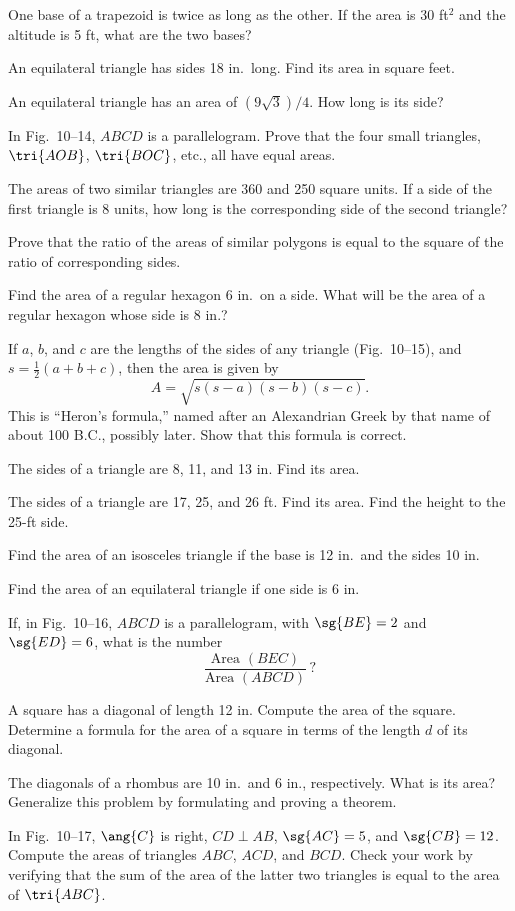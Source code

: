 \documentclass[11pt]{book}
\theoremstyle{bkplain}
\theoremstyle{XIplainnote}
\theoremstyle{bkplain}
\theoremstyle{bkplain}
\begin{document}
\begin{exercisecols}
\begin{exlist}
\item One base of a trapezoid is twice as long as the other. If the area is
  30 ft$^2$ and the altitude is 5 ft, what are the two bases?
\item An equilateral triangle has sides 18 in.\ long. Find its area in square
  feet.
\item An equilateral triangle has an area of $(9\sqrt{3})/4$. How long is its
  side?
\item In Fig.~10--14, $ABCD$ is a parallelogram. Prove that the four small
  triangles, $\tri{AOB}$, $\tri{BOC}$, etc., all have equal areas.
\exfig{\FIGXFOURTEEN}
\item The areas of two similar triangles are 360 and 250 square units. If a
  side of the first triangle is 8 units, how long is the corresponding side of
  the second triangle?
\item[\stex 28.] Prove that the ratio of the areas of similar polygons is equal
  to the square of the ratio of corresponding sides.
\item[29.] Find the area of a regular hexagon 6 in.\ on a side. What will be
  the area of a regular hexagon whose side is 8 in.?
\item[\stex 30.] If $a$, $b$, and $c$ are the lengths of the sides of any
  triangle (Fig.~10--15), and $s = \frac{1}{2}(a + b + c)$, then the area is
  given by
  \[ A = \sqrt{s(s\!-\!a)(s\!-\!b)(s\!-\!c)}. \]
  This is ``Heron's formula,'' named after an Alexandrian Greek by that name of
  about 100 B.C., possibly later. Show that this formula is correct.
\exfig{\FIGXFIFTEEN}
\item[31.] The sides of a triangle are 8, 11, and 13 in. Find its area.
\item[32.] The sides of a triangle are 17, 25, and 26 ft. Find its area. Find
  the height to the 25-ft side.
\item[33.] Find the area of an isosceles triangle if the base is 12 in.\ and
  the sides 10 in.
\item[34.] Find the area of an equilateral triangle if one side is 6 in.
\item[35.] If, in Fig.~10--16, $ABCD$ is a parallelogram, with $\sg{BE} = 2$
  and $\sg{ED} = 6$, what is the number
  \[ \frac{\text{Area } (BEC)}{\text{Area } (ABCD)}\,? \]
\exfig{\FIGXSIXTEEN}
\item[36.] A square has a diagonal of length 12 in. Compute the area of the
  square. Determine a formula for the area of a square in terms of the length
  $d$ of its diagonal.
\item[37.] The diagonals of a rhombus are 10 in.\ and 6 in., respectively. What
  is its area? Generalize this problem by formulating and proving a theorem.
\item[38.] In Fig.~10--17, $\ang{C}$ is right, $CD \perp AB$, $\sg{AC} = 5$,
  and $\sg{CB} = 12$. Compute the areas of triangles $ABC$, $ACD$, and $BCD$.
  Check your work by verifying that the sum of the area of the latter two
  triangles is equal to the area of $\tri{ABC}$.
\exfig{\FIGXSEVENTEEN}
\end{exlist}
\end{exercisecols}
\end{document}
